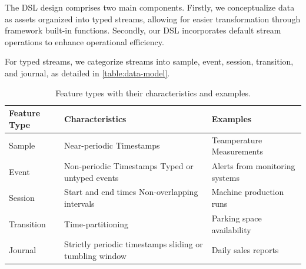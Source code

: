 The DSL design comprises two main components. Firstly, we conceptualize data as assets organized into typed streams, allowing for easier transformation through framework built-in functions. Secondly, our DSL incorporates default stream operations to enhance operational efficiency.

For typed streams, we categorize streams into sample, event, session, transition, and journal, as detailed in \autoref{table:data-model}.

\begin{table}[ht]
\centering
\begin{tabular}{l p{6cm} p{5cm}}
    \hline
    Feature Type & Characteristics & Examples \\ \hline 
    Sample & Near-periodic Timestamps & Teamperature Measurements \\
    Event & Non-periodic Timestamps \newline  Typed or untyped events & Alerts from monitoring systems \\
    Session & Start and end times \newline Non-overlapping intervals & Machine production runs \\
    Transition & Time-partitioning & Parking space availability \\
    Journal & Strictly periodic timestamps \newline sliding or tumbling window & Daily sales reports \\
    \hline
\end{tabular}
\caption{Feature types with their characteristics and examples.}
\label{table:data-model}
\end{table}

